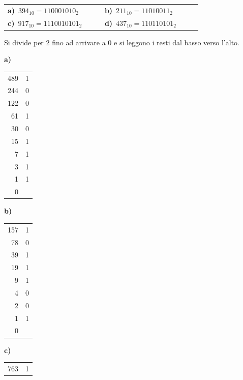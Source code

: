 \begin{esercizio}[8]
\begin{solution}
{\par\smallskip\noindent\hspace*{1em}\begin{tabular}{@{}p{0.42\linewidth}p{0.42\linewidth}@{}}
  \textbf{a)}~$394_{10} = 110001010_2$ & \textbf{b)}~$211_{10} = 11010011_2$\\[4pt]
  \textbf{c)}~$917_{10} = 1110010101_2$ & \textbf{d)}~$437_{10} = 110110101_2$
\end{tabular}\par\smallskip
  Si divide per 2 fino ad arrivare a 0 e si leggono i resti dal basso verso l'alto.}{%
\noindent
  \begin{minipage}[t]{0.24\linewidth}
  \textbf{a)}\\[2pt]
  {\small\renewcommand{\arraystretch}{1.0}\begin{tabular}{r|l}
    489 & 1\\
    244 & 0\\
    122 & 0\\
    61 & 1\\
    30 & 0\\
    15 & 1\\
    7 & 1\\
    3 & 1\\
    1 & 1\\
    0 & \\
  \end{tabular}}
  \end{minipage}\hfill
  \begin{minipage}[t]{0.24\linewidth}
  \textbf{b)}\\[2pt]
  {\small\renewcommand{\arraystretch}{1.0}\begin{tabular}{r|l}
    157 & 1\\
    78 & 0\\
    39 & 1\\
    19 & 1\\
    9 & 1\\
    4 & 0\\
    2 & 0\\
    1 & 1\\
    0 & \\
  \end{tabular}}
  \end{minipage}\hfill
  \begin{minipage}[t]{0.24\linewidth}
  \textbf{c)}\\[2pt]
  {\small\renewcommand{\arraystretch}{1.0}\begin{tabular}{r|l}
    763 & 1\\

\end{tabular}}
\end{minipage}}
\end{solution}
\end{esercizio}
